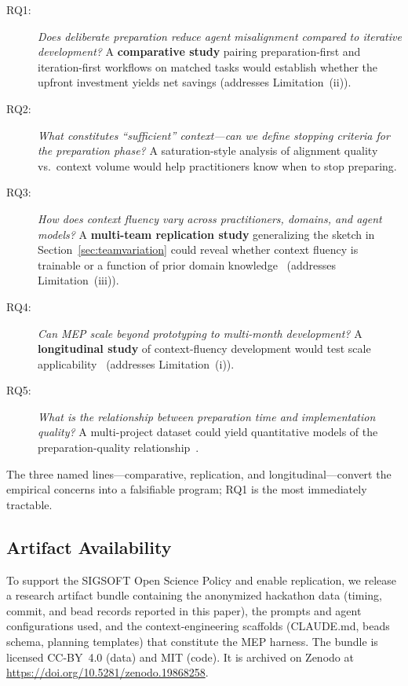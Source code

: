 \begin{description}
  \item[RQ1:] \emph{Does deliberate preparation reduce agent
    misalignment compared to iterative development?} A
    \textbf{comparative study} pairing preparation-first and
    iteration-first workflows on matched tasks would establish
    whether the upfront investment yields net savings (addresses
    Limitation~(ii)).

  \item[RQ2:] \emph{What constitutes ``sufficient'' context---can we
    define stopping criteria for the preparation phase?} A
    saturation-style analysis of alignment quality vs.\ context
    volume would help practitioners know when to stop preparing.

  \item[RQ3:] \emph{How does context fluency vary across
    practitioners, domains, and agent models?} A \textbf{multi-team
    replication study} generalizing the sketch in
    Section~\ref{sec:teamvariation} could reveal whether context
    fluency is trainable or a function of prior domain
    knowledge~\cite{polanyi1958personal} (addresses
    Limitation~(iii)).

  \item[RQ4:] \emph{Can MEP scale beyond prototyping to multi-month
    development?} A \textbf{longitudinal study} of context-fluency
    development would test scale
    applicability~\cite{dakhel2025humanai} (addresses
    Limitation~(i)).

  \item[RQ5:] \emph{What is the relationship between preparation
    time and implementation quality?} A multi-project dataset could
    yield quantitative models of the preparation-quality
    relationship~\cite{alomar2025promptware}.
\end{description}

The three named lines---comparative, replication, and
longitudinal---convert the empirical concerns into a falsifiable
program; RQ1 is the most immediately tractable.

\subsection{Artifact Availability}
\label{sec:artifact}

To support the SIGSOFT Open Science Policy and enable replication, we
release a research artifact bundle containing the anonymized hackathon
data (timing, commit, and bead records reported in this paper), the
prompts and agent configurations used, and the context-engineering
scaffolds (CLAUDE.md, beads schema, planning templates) that
constitute the MEP harness. The bundle is licensed CC-BY~4.0 (data) and
MIT (code). It is archived on Zenodo at
\url{https://doi.org/10.5281/zenodo.19868258}.

